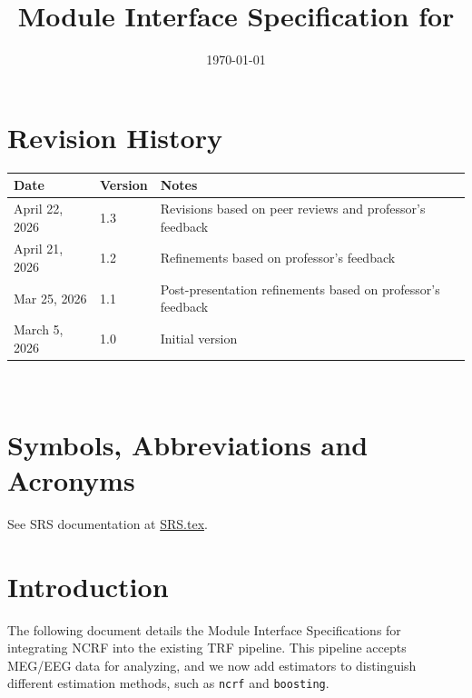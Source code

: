 \documentclass[12pt, titlepage]{article}
\begin{document}
\title{Module Interface Specification for \progname{}}

\author{\authname}

\date{\today}

\maketitle


\section{Revision History}

\begin{tabularx}{\textwidth}{p{3cm}p{2cm}X}
\toprule {\bf Date} & {\bf Version} & {\bf Notes}\\
\midrule
April 22, 2026 & 1.3 & Revisions based on peer reviews and professor's feedback\\
April 21, 2026 & 1.2 & Refinements based on professor's feedback\\
Mar 25, 2026 & 1.1 & Post-presentation refinements based on professor's feedback\\
March 5, 2026 & 1.0 & Initial version\\
\bottomrule
\end{tabularx}

~\newpage

\section{Symbols, Abbreviations and Acronyms}

See SRS documentation at
\href{https://github.com/Daffodil404/yanyu_wu_cas741/blob/main/docs/SRS/SRS.tex}{SRS.tex}.


\newpage

\tableofcontents

\newpage


\section{Introduction}

The following document details the Module Interface Specifications for integrating NCRF into the existing TRF pipeline. This pipeline accepts MEG/EEG data for analyzing, and we now add estimators to distinguish different estimation methods, such as \texttt{ncrf} and \texttt{boosting}.
\end{document}
